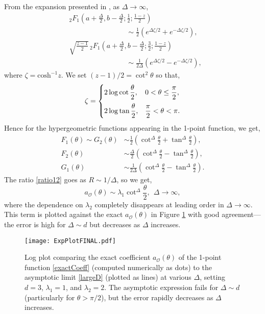 \documentclass[reprint,amsmath,amssymb,aps,nofootinbib,twocolumn]{revtex4-2}
\begin{document}
\begin{appendix}
From the expansion presented in \cite{Jones:2001hyp}, as $\Delta \to \infty$,
\begin{align}
&_2F_1\left(a + \frac{\Delta}{2},b-\frac{\Delta}{2};\frac{1}{2};\frac{1-z}{2}\right)\nonumber\\
&\qquad\qquad\qquad\qquad\sim \frac{1}{2}\left(e^{\Delta\zeta/2} + e^{-\Delta\zeta/2}\right),\\
&\sqrt{\frac{z-1}{2}}\,_2F_1\left(a + \frac{\Delta}{2},b-\frac{\Delta}{2};\frac{3}{2};\frac{1-z}{2}\right)\nonumber\\
&\qquad\qquad\qquad\qquad\sim \frac{1}{2\Delta}\left(e^{\Delta\zeta/2} - e^{-\Delta\zeta/2}\right),
\end{align}
where $\zeta = \text{cosh}^{-1}z$. We set $(z-1)/2 = \cot^2\theta$ so that,
\begin{equation}
\zeta = \begin{cases}
2\log\cot\dfrac{\theta}{2},&0 < \theta \leq \dfrac{\pi}{2},\vspace{0.2cm}\\
2\log\tan\dfrac{\theta}{2},&\dfrac{\pi}{2} < \theta < \pi.
\end{cases}
\end{equation}
Hence for the hypergeometric functions appearing in the 1-point function, we get,
\begin{align}
F_1(\theta) \sim G_2(\theta) &\sim \frac{1}{2}\left(\cot^\Delta \frac{\theta}{2} + \tan^\Delta \frac{\theta}{2}\right),\\
F_2(\theta) &\sim \frac{\Delta}{2}\left(\cot^\Delta \frac{\theta}{2} - \tan^\Delta\frac{\theta}{2}\right),\\
G_1(\theta) &\sim \frac{1}{2\Delta}\left(\cot^\Delta\frac{\theta}{2} - \tan^\Delta\frac{\theta}{2}\right).
\end{align}
The ratio \eqref{ratio12} goes as $R \sim 1/\Delta$, so we get,
\begin{equation}
a_\mathcal{O}(\theta) \sim \lambda_1 \cot^\Delta\frac{\theta}{2},\ \ \Delta \to \infty,\label{largeD}
\end{equation}
where the dependence on $\lambda_2$ completely disappears at leading order in $\Delta \to \infty$. This term is plotted against the exact $a_\mathcal{O}(\theta)$ in Figure \ref{figs:expansionA} with good agreement---the error is high for $\Delta \sim d$ but decreases as $\Delta$ increases.

\begin{figure}
\texttt{[image: ExpPlotFINAL.pdf]}
\caption{Log plot comparing the exact coefficient $a_\mathcal{O}(\theta)$ of the 1-point function \eqref{exactCoeff} (computed numerically as dots) to the asymptotic limit \eqref{largeD} (plotted as lines) at various $\Delta$, setting $d = 3$, $\lambda_1 = 1$, and $\lambda_2 = 2$. The asymptotic expression fails for $\Delta \sim d$ (particularly for $\theta > \pi/2$), but the error rapidly decreases as $\Delta$ increases.}
\label{figs:expansionA}
\end{figure}



\end{appendix}
\end{document}
